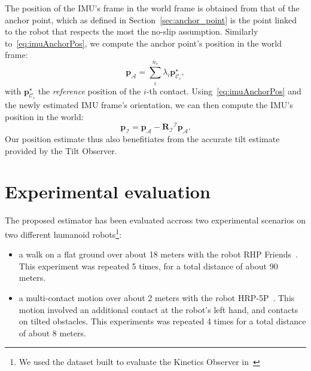 \documentclass{IJCAS}
\begin{document}
The position of the IMU's frame in the world frame is obtained from that of the anchor point, which as defined in Section~\ref{sec:anchor_point} is the point linked to the robot that respects the most the no-slip assumption. 
Similarly to~\eqref{eq:imuAnchorPos}, we compute the anchor point's position in the world frame:
\begin{equation}
    \boldsymbol{p}_{\mathcal{A}} = \sum^{n_{c}}_{i} \lambda_{i} \boldsymbol{p}^{\star}_{{\mathcal{C}}_{i}},
\end{equation}
with $\boldsymbol{p}^{\star}_{{\mathcal{C}}_{i}}$ the \emph{reference} position of the $i$-th contact.
Using~\eqref{eq:imuAnchorPos} and the newly estimated IMU frame's orientation, we can then compute the IMU's position in the world:
\begin{equation}
    \boldsymbol{p}_{\mathcal{I}} = \boldsymbol{p}_{\mathcal{A}} - \boldsymbol{R}_{\mathcal{I}} {}^{\mathcal{I}}\boldsymbol{p}_{\mathcal{A}}.
\end{equation}
Our position estimate thus also benefitiates from the accurate tilt estimate provided by the Tilt Observer.


\section{Experimental evaluation}

The proposed estimator has been evaluated accross two experimental scenarios on two different humanoid robots\footnote{We used the dataset built to evaluate the Kinetics Observer in~\cite{Demont2024KineticsObserver}}:
\begin{itemize}
    \item a walk on a flat ground over about 18 meters with the robot RHP Friends~\cite{Benallegue2025RhpFriendsJRL}. This experiment was repeated 5 times, for a total distance of about 90 meters. 
    \item a multi-contact motion over about 2 meters with the robot HRP-5P~\cite{Kaneko2019Hrp5}. This motion involved an additional contact at the robot's left hand, and contacts on tilted obstacles. This experiments was repeated 4 times for a total distance of about 8 meters.
\end{itemize}
\end{document}
